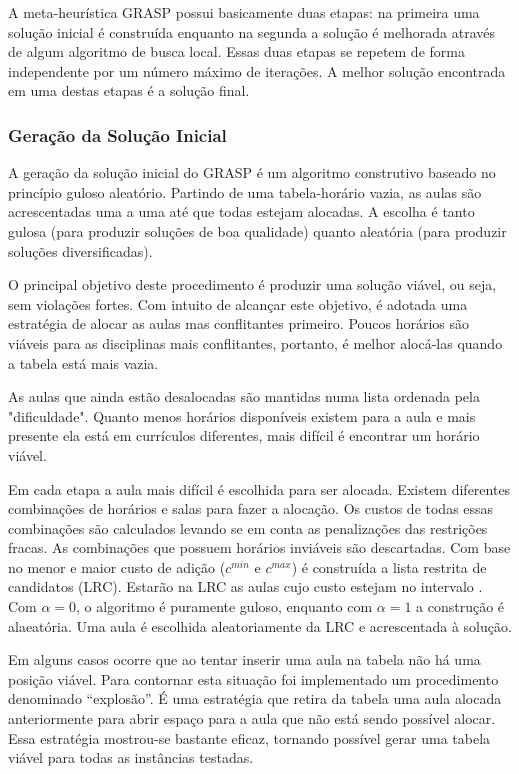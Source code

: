 \documentclass[11pt]{article}
\begin{document}
A meta-heurística GRASP \cite{grasp_resende_ribeiro} possui basicamente duas etapas: na primeira uma solução inicial é construída enquanto na segunda a solução é melhorada através de algum algoritmo de busca local. Essas duas etapas se repetem de forma independente por um número máximo de iterações. A melhor solução encontrada em uma destas etapas é a solução final.

\subsubsection{Geração da Solução Inicial}

A geração da solução inicial do GRASP é um algoritmo construtivo baseado no princípio guloso aleatório. Partindo de uma tabela-horário vazia, as aulas são acrescentadas uma a uma até que todas estejam alocadas. A escolha é tanto gulosa (para produzir soluções de boa qualidade) quanto aleatória (para produzir soluções diversificadas).

O principal objetivo deste procedimento é produzir uma solução viável, ou seja, sem violações fortes. Com intuito de alcançar este objetivo, é adotada uma estratégia de alocar as aulas mas conflitantes primeiro. Poucos horários são viáveis para as disciplinas mais conflitantes, portanto, é melhor alocá-las quando a tabela está mais vazia.

As aulas que ainda estão desalocadas são mantidas numa lista ordenada pela "dificuldade". Quanto menos horários disponíveis existem para a aula e mais presente ela está em currículos diferentes, mais difícil é encontrar um horário viável.

Em cada etapa a aula mais difícil é escolhida para ser alocada. Existem diferentes combinações de horários e salas para fazer a alocação. Os custos de todas essas combinações são calculados levando se em conta as penalizações das restrições fracas. As combinações que possuem horários inviáveis são descartadas. Com base no menor e maior custo de adição ($c^{min}$ e $c^{max}$) é construída a lista restrita de candidatos (LRC). Estarão na LRC as aulas cujo custo estejam no intervalo \begin{math} [c^{min}, c^{min}+\alpha(c^{max} - c^{min})]\end{math}. Com $\alpha=0$, o algoritmo é puramente guloso, enquanto com $\alpha=1$ a construção é alaeatória. Uma aula é escolhida aleatoriamente da LRC e acrescentada à solução.

Em alguns casos ocorre que ao tentar inserir uma aula na tabela não há uma posição viável. Para contornar esta situação foi implementado um procedimento denominado “explosão”. É uma estratégia que retira da tabela uma aula alocada anteriormente para abrir espaço para a aula que não está sendo possível alocar. Essa estratégia mostrou-se bastante eficaz, tornando possível gerar uma tabela viável para todas as instâncias testadas.
\end{document}
